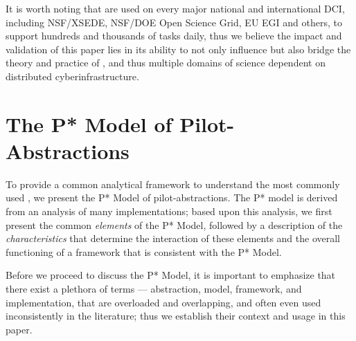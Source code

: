 \documentclass{sig-alternate}
\begin{document}

It is worth noting that \pilotjobs are used on every major
national and international DCI, including NSF/XSEDE,
NSF/DOE Open Science Grid, EU EGI and others, to support hundreds and
thousands of tasks daily, thus we believe the impact and validation of
this paper lies in its ability to not only influence but also bridge
the theory and practice of \pilotjobs, and thus multiple domains of
science dependent on distributed cyberinfrastructure.








\section{The P* Model of Pilot-\\Abstractions}
\label{sec:pilot-model}


To provide a common analytical framework to understand the most
commonly used \pilotjobs, we present the P* Model of
pilot-abstractions. The P* model is derived from an analysis of many
\pilotjob implementations; based upon this analysis, we first present
the common {\it elements} of the P* Model, followed by a description
of the {\it characteristics} that determine the interaction of these
elements and the overall functioning of a \pilotjob framework that is
consistent with the P* Model.


 
Before we proceed to discuss the P* Model, it is important to
emphasize that there exist a plethora of terms --- abstraction, model,
framework, and implementation, that are overloaded and overlapping,
and often even used inconsistently in the literature; thus we
establish their context and usage in this paper.
\end{document}

